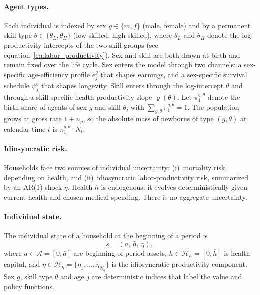 \documentclass[12pt,a4paper]{article}
\begin{document}
\paragraph{Agent types.}
Each individual is indexed by sex $g \in \{m, f\}$ (male, female) and by a permanent skill type $\theta \in \{\theta_L, \theta_H\}$ (low-skilled, high-skilled), where $\theta_L$ and $\theta_H$ denote the log-productivity intercepts of the two skill groups (see equation~\eqref{eq:labor_productivity}). Sex and skill are both drawn at birth and remain fixed over the life cycle. Sex enters the model through two channels: a sex-specific age-efficiency profile $e^g_j$ that shapes earnings, and a sex-specific survival schedule $\psi^g_j$ that shapes longevity. Skill enters through the log-intercept $\theta$ and through a skill-specific health-productivity slope $\varrho(\theta)$. Let $\pi^{g,\theta}_1$ denote the birth share of agents of sex $g$ and skill $\theta$, with $\sum_{g,\theta} \pi^{g,\theta}_1 = 1$. The population grows at gross rate $1 + n_p$, so the absolute mass of newborns of type $(g,\theta)$ at calendar time $t$ is $\pi^{g,\theta}_1 \cdot N_t$.

\paragraph{Idiosyncratic risk.}
Households face two sources of individual uncertainty: (i)~mortality risk, depending on health, and (ii)~idiosyncratic labor-productivity risk, summarized by an AR(1) shock $\eta$. Health $h$ is endogenous: it evolves deterministically given current health and chosen medical spending. There is no aggregate uncertainty.

\paragraph{Individual state.}
The individual state of a household at the beginning of a period is
\begin{equation}
\label{eq:state}
s = (a,\, h,\, \eta),
\end{equation}
where $a \in \mathcal{A} = [0, \bar{a}]$ are beginning-of-period assets, $h \in \mathcal{H}_h = [0, \bar{h}]$ is health capital, and $\eta \in \mathcal{H}_\eta = \{\eta_1, \ldots, \eta_{N_\eta}\}$ is the idiosyncratic productivity component. Sex $g$, skill type $\theta$ and age $j$ are deterministic indices that label the value and policy functions.
\end{document}
